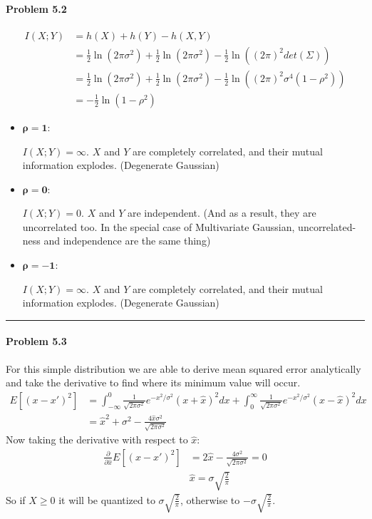 \documentclass[12pt, letterpaper]{scrartcl}
\begin{document}
\paragraph*{Problem 5.2} \hfill\newline
\begin{align*}
    I(X;Y) &= h(X) + h(Y) - h(X, Y)\\
    &=\frac{1}{2}\ln(2\pi \sigma^2)+\frac{1}{2}\ln(2\pi \sigma^2)-\frac{1}{2}\ln((2\pi )^2det(\Sigma))\\
    &=\frac{1}{2}\ln(2\pi \sigma^2)+\frac{1}{2}\ln(2\pi \sigma^2)-\frac{1}{2}\ln((2\pi )^2\sigma^4(1-\rho^2))\\
    &=-\frac{1}{2}\ln(1-\rho^2)
\end{align*}
\begin{itemize}
    \item $\mathbf{\rho=1}$: 
    
    $I(X;Y)=\infty$. $X$ and $Y$ are completely correlated, and their mutual information explodes. (Degenerate Gaussian)
    \item $\mathbf{\rho=0}$: 
    
    $I(X;Y)=0$. $X$ and $Y$ are independent. (And as a result, they are uncorrelated too. In the special case of Multivariate Gaussian, uncorrelated-ness and independence are the same thing)
    \item $\mathbf{\rho=-1}$: 
    
    $I(X;Y)=\infty$. $X$ and $Y$ are completely correlated, and their mutual information explodes. (Degenerate Gaussian)
\end{itemize}
\hrule

\paragraph*{Problem 5.3} \hfill\newline
For this simple distribution we are able to derive mean squared error analytically and take the derivative to find where its minimum value will occur.
\begin{align*}
    E[(x-x')^2]&=\int_{-\infty}^0 \frac{1}{\sqrt{2\pi\sigma^2}} e^{-x^2/\sigma^2}(x+\hat{x})^2dx +\int_0^\infty \frac{1}{\sqrt{2\pi\sigma^2}}e^{-x^2/\sigma^2}(x-\hat{x})^2dx\\
    &=\hat{x}^2+\sigma^2-\frac{4\hat{x}\sigma^2}{\sqrt{2\pi\sigma^2}}
\end{align*}
Now taking the derivative with respect to $\hat{x}$:
\begin{align*}
    \frac{\partial}{\partial\hat{x}}E[(x-x')^2]&=2\hat{x}-\frac{4\sigma^2}{\sqrt{2\pi\sigma^2}}=0\\
    &\hat{x}=\sigma\sqrt{\frac{2}{\pi}}
\end{align*}
So if $X\geq0$ it will be quantized to $\sigma\sqrt{\frac{2}{\pi}}$, otherwise to $-\sigma\sqrt{\frac{2}{\pi}}$.
\end{document}
